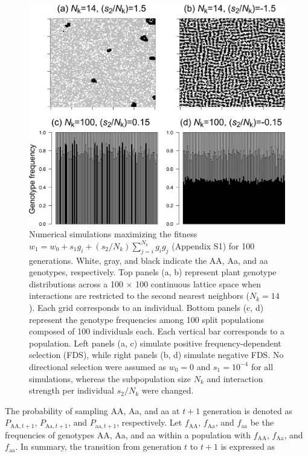 \documentclass[12pt,]{article}
\begin{document}
\begin{figure}[]
  \includegraphics[width=0.8\linewidth]{IsingExample.png}
  \caption{Numerical simulations maximizing the fitness $w_1 = w_0 + s_1g_i + (s_2 / {N_k})\sum^{N_k}_{j=i}{g_ig_j}$ (Appendix S1) for 100 generations. White, gray, and black indicate the AA, Aa, and aa genotypes, respectively. Top panels (a, b) represent plant genotype distributions across a 100 $\times$ 100 continuous lattice space when interactions are restricted to the second nearest neighbors ($N_k=14$). Each grid corresponds to an individual. Bottom panels (c, d) represent the genotype frequencies among 100 split populations composed of 100 individuals each. Each vertical bar corresponds to a population. Left panels (a, c) simulate positive frequency-dependent selection (FDS), while right panels (b, d) simulate negative FDS. No directional selection were assumed as $w_0 = 0$ and $s_1 = 10^{-4}$ for all simulations, whereas the subpopulation size $N_k$ and interaction strength per individual $s_2/N_k$ were changed.}
  \label{figS1:Ising}
\end{figure}

\noindent
The probability of sampling AA, Aa, and aa at $t+1$ generation is denoted as $P_{\mathrm{AA},t+1}$, $P_{\mathrm{Aa},t+1}$, and $P_{\mathrm{aa},t+1}$, respectively. Let $f_\mathrm{AA}$, $f_\mathrm{Aa}$, and $f_\mathrm{aa}$ be the frequencies of genotypes AA, Aa, and aa within a population with $f_\mathrm{AA}$, $f_\mathrm{Aa}$, and $f_\mathrm{aa}$. In summary, the transition from generation $t$ to $t+1$ is expressed as
\end{document}
